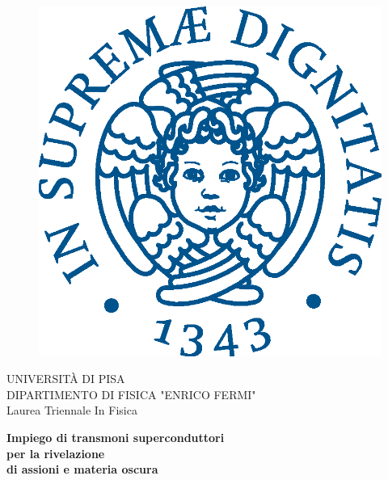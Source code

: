 \begin{titlepage}
\begin{figure}[!htb]
    \centering
    \includegraphics[keepaspectratio=true,scale=0.5]{images/Frontespizio/cherubinFrontespizio.eps}
\end{figure}

\begin{center}
    \LARGE{UNIVERSITÀ DI PISA}
    \vspace{5mm}
    \\ \large{DIPARTIMENTO DI FISICA "ENRICO FERMI" }
    \vspace{5mm}
    \\ \LARGE{Laurea Triennale In Fisica}
\end{center}

\vspace{15mm}
\begin{center}
    {\LARGE{\bf Impiego di transmoni superconduttori \\ \vspace{1mm} per la rivelazione \\ \vspace{3mm} di    assioni e materia oscura
 }}
    
    

\end{center}
\end{titlepage}
